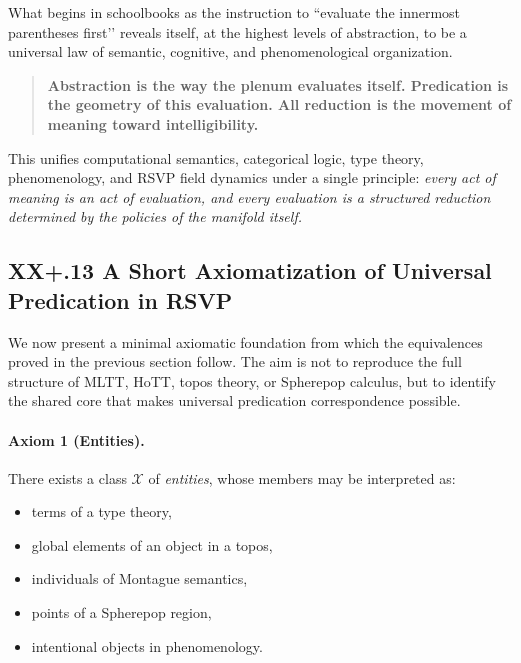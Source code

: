 \documentclass[12pt,letterpaper]{article}
\begin{document}
What begins in schoolbooks as the instruction to ``evaluate the innermost
parentheses first’’ reveals itself, at the highest levels of abstraction, to be
a universal law of semantic, cognitive, and phenomenological organization.

\begin{quote}
\textbf{Abstraction is the way the plenum evaluates itself.  
Predication is the geometry of this evaluation.  
All reduction is the movement of meaning toward intelligibility.}
\end{quote}

This unifies computational semantics, categorical logic, type theory,
phenomenology, and RSVP field dynamics under a single principle:  
\emph{every act of meaning is an act of evaluation, and every evaluation is a
structured reduction determined by the policies of the manifold itself.}

\subsection{XX+.13 A Short Axiomatization of Universal Predication in RSVP}

We now present a minimal axiomatic foundation from which the equivalences proved
in the previous section follow.  The aim is not to reproduce the full structure
of MLTT, HoTT, topos theory, or Spherepop calculus, but to identify the shared
core that makes universal predication correspondence possible.

\paragraph{Axiom 1 (Entities).}
There exists a class $\mathcal{X}$ of \emph{entities}, whose members may be
interpreted as:
\begin{itemize}
    \item terms of a type theory,
    \item global elements of an object in a topos,
    \item individuals of Montague semantics,
    \item points of a Spherepop region,
    \item intentional objects in phenomenology.
\end{itemize}

\end{document}
